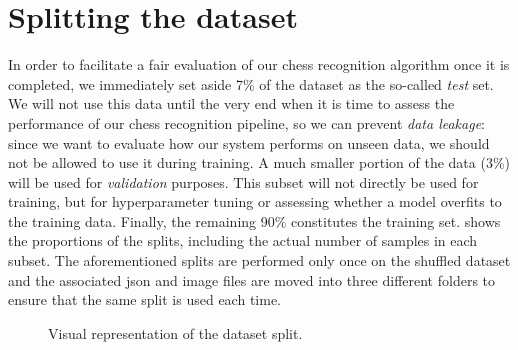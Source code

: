 \documentclass[../main.tex]{subfiles}
\begin{document}
\section{Splitting the dataset}
In order to facilitate a fair evaluation of our chess recognition algorithm once it is completed, we immediately set aside 7\% of the dataset as the so-called \emph{test} set.
We will not use this data until the very end when it is time to assess the performance of our chess recognition pipeline, so we can prevent \emph{data leakage}: since we want to evaluate how our system performs on unseen data, we should not be allowed to use it during training.
A much smaller portion of the data (3\%) will be used for \emph{validation} purposes.
This subset will not directly be used for training, but for hyperparameter tuning or assessing whether a model overfits to the training data.
Finally, the remaining 90\% constitutes the training set.
 shows the proportions of the splits, including the actual number of samples in each subset.
The aforementioned splits are performed only once on the shuffled dataset and the associated \gls{json} and image files are moved into three different folders to ensure that the same split is used each time.

\begin{figure}
    \caption{Visual representation of the dataset split.}
    \label{fig:dataset_split}
\end{figure}
\end{document}
